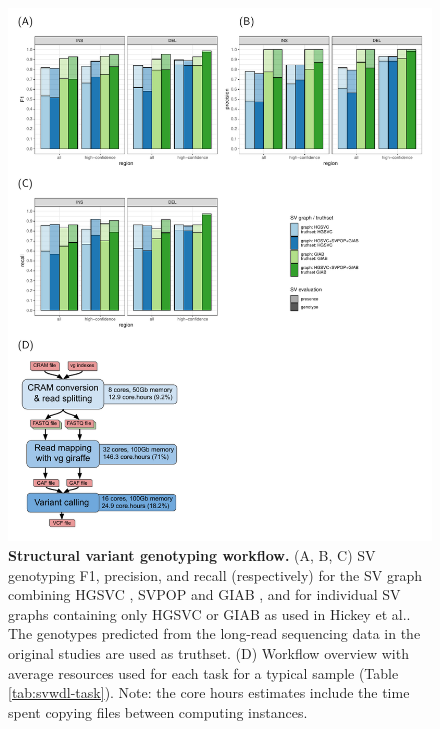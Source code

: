 \documentclass[11pt]{ucscthesis}
\begin{document}
\begin{figure}[htp]
    \centering
    \includegraphics[width=.9\linewidth]{aim2_supplement_wdl-sveval.pdf}
    \caption[Structural variant genotyping workflow]{\textbf{Structural variant genotyping workflow.}
      (A, B, C) SV genotyping F1, precision, and recall (respectively) for the SV graph combining HGSVC \cite{chaisson_sv_2019}, SVPOP \cite{audano2019c} and GIAB \cite{zook_robust_2020}, and for individual SV graphs containing only HGSVC or GIAB as used in Hickey et al.\cite{hickey_vgsv_2020}.
      The genotypes predicted from the long-read sequencing data in the original studies are used as truthset.
      (D) Workflow overview with average resources used for each task for a typical sample (Table \ref{tab:svwdl-task}). Note: the core hours estimates include the time spent copying files between computing instances.
    }
    \label{fig:sv-wdl-graph}
\end{figure}
\end{document}
